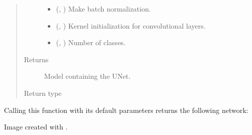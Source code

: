 \documentclass[letterpaper,10pt,english]{sphinxmanual}
\begin{document}
\begin{fulllineitems}
\begin{quote}
\begin{description}
\begin{itemize}
\item {} 
 (, ) \textendash{} Make batch normalization.

\item {} 
 (, ) \textendash{} Kernel initialization for convolutional layers.

\item {} 
 (, ) \textendash{} Number of classes.

\end{itemize}

\item[{Returns}] \leavevmode
{} \textendash{} Model containing the U\sphinxhyphen{}Net.

\item[{Return type}] \leavevmode
{}

\end{description}\end{quote}

Calling this function with its default parameters returns the following
network:


Image created with .

\end{fulllineitems}

\end{document}
